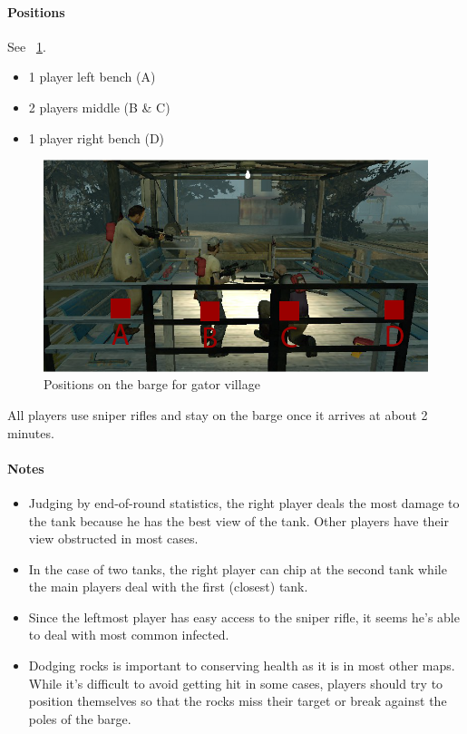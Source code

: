 \paragraph{Positions} See \figurename\ \ref{fig:gator_positions}.
\begin{itemize}
\item 1 player left bench (A)
\item 2 players middle (B \& C)
\item 1 player right bench (D)
\end{itemize}
\begin{figure}[htb!]
\centering
\includegraphics[width=0.7\columnwidth]{gator/gator_positions}
\caption{Positions on the barge for gator village}
\label{fig:gator_positions}
\end{figure}

All players use sniper rifles and stay on the barge once it arrives at about 2 minutes.

\paragraph{Notes}
\begin{itemize}
\item Judging by end-of-round statistics, the right player deals the most damage to the tank because he has the best view of the tank. Other players have their view obstructed in most cases.
\item In the case of two tanks, the right player can chip at the second tank while the main players deal with the first (closest) tank.
\item Since the leftmost player has easy access to the sniper rifle, it seems he's able to deal with most common infected.
\item Dodging rocks is important to conserving health as it is in most other maps. While it's difficult to avoid getting hit in some cases, players should try to position themselves so that the rocks miss their target or break against the poles of the barge.
\end{itemize}

